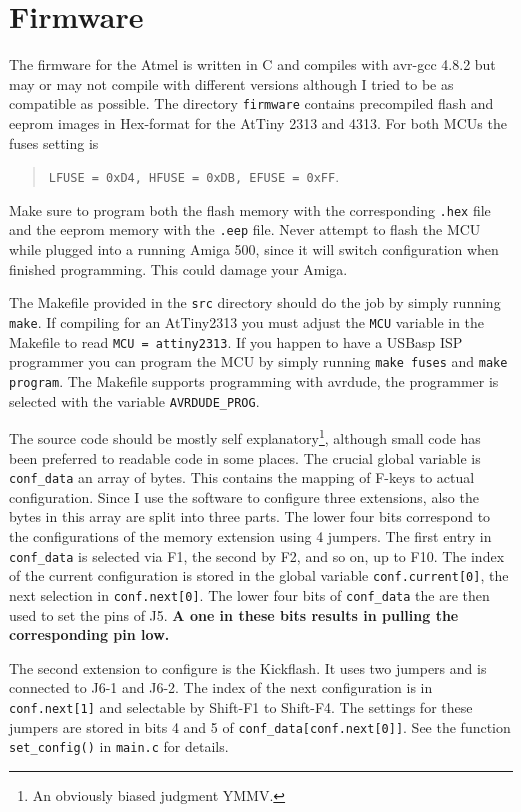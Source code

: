 \documentclass[DIV10]{scrartcl}
\begin{document}
\section{Firmware}
The firmware for the Atmel is written in C and compiles with avr-gcc
4.8.2 but may or may not compile with different versions although I
tried to be as compatible as possible. The directory \verb#firmware#
contains precompiled flash and eeprom images in Hex-format for the
AtTiny 2313 and 4313. For both MCUs the fuses setting is
\begin{quote}
  \verb#LFUSE = 0xD4, HFUSE = 0xDB, EFUSE = 0xFF#.
\end{quote}
Make sure to program both the flash memory with the corresponding
\verb#.hex# file and the eeprom memory with the \verb#.eep#
file. Never attempt to flash the MCU while plugged into a running
Amiga 500, since it will switch configuration when finished
programming. This could damage your Amiga.


The Makefile provided in the \texttt{src} directory should do the job
by simply running \texttt{make}. If compiling for an AtTiny2313 you
must adjust the \texttt{MCU} variable in the Makefile to read
\texttt{MCU = attiny2313}. If you happen to have a USBasp ISP
programmer \cite{USBasp} you can program the MCU by simply running
\texttt{make fuses} and \texttt{make program}. The Makefile supports
programming with avrdude, the programmer is selected with the variable
\verb#AVRDUDE_PROG#. 

The source code should be mostly self explanatory\footnote{An
  obviously biased judgment YMMV.}, although small code
has been preferred to readable code in some places. The crucial global
variable is \verb#conf_data# an array of bytes. This contains the
mapping of F-keys to actual configuration. Since I use the software to
configure three extensions, also the bytes in this array are split
into three parts. The lower four bits correspond to the configurations
of the memory extension using 4 jumpers. The first entry in
\verb#conf_data# is selected via F1, the second by F2, and so on, up
to F10. The index of the current configuration is stored in the global
variable \verb#conf.current[0]#, the next selection in
\verb#conf.next[0]#.  The lower four bits of \verb#conf_data# the are
then used to set the pins of J5. {\bfseries A one in these bits
  results in pulling the corresponding pin low.}

The second extension to configure is the Kickflash. It uses two
jumpers and is connected to J6-1 and J6-2. The index of the next
configuration is in \verb#conf.next[1]# and selectable by Shift-F1
to Shift-F4. The settings for these jumpers are stored in bits 4 and 5
of \verb#conf_data[conf.next[0]]#. See the function
\verb#set_config()# in \verb#main.c# for details.
\end{document}

